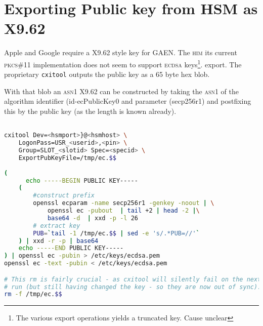 \documentclass[11pt,a4]{article}
\begin{document}
\preamble

\newcommand{\chapter}{\section}

\section*{Exporting Public key from HSM as X9.62}

Apple and Google require a X9.62 style key for GAEN. The \textsc{him} its current \textsc{pkcs\#11} implementation does not seem to support \textsc{ecdsa} keys\footnote{The various export operations yields a truncated key. Cause unclear}. export. The proprietary { \texttt{cxitool}} outputs the public key as a 65 byte hex blob.

With that blob an \textsc{asn1} X9.62 can be constructed by taking the \textsc{asn1} of the algorithm identifier (id-ecPublicKey0  and parameter (secp256r1) and postfixing this by the public key (as the length is known already).

\begin{lstlisting}[language=bash,]

cxitool Dev=<hsmport>}@<hsmhost> \
	LogonPass=USR_<userid>,<pin> \
	Group=SLOT_<slotid> Spec=<specid> \
	ExportPubKeyFile=/tmp/ec.$$
	
(
	  echo -----BEGIN PUBLIC KEY----- 
	(
		#construct prefix
		openssl ecparam -name secp256r1 -genkey -noout | \
			openssl ec -pubout  | tail +2 | head -2 |\
			base64 -d  | xxd -p -l 26
		# extract key 
		PUB=`tail -1 /tmp/ec.$$ | sed -e 's/.*PUB=//'`
	) | xxd -r -p | base64
	echo -----END PUBLIC KEY----- 
) | openssl ec -pubin > /etc/keys/ecdsa.pem
openssl ec -text -pubin < /etc/keys/ecdsa.pem

# This rm is fairly crucial - as cxitool will silently fail on the next
# run (but still having changed the key - so they are now out of sync).
rm -f /tmp/ec.$$

\end{lstlisting}



\closingpage
\end{document}
